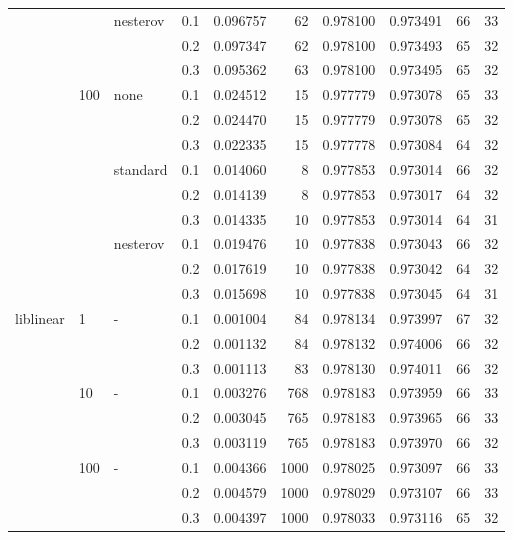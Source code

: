 \begin{table}[H]
\begin{tabular}{llllrrrrrr}
          &     & nesterov & 0.1 &  0.096757 &      62 &  0.978100 &  0.973491 &          66 &        33 \\
          &     &   & 0.2 &  0.097347 &      62 &  0.978100 &  0.973493 &          65 &        32 \\
          &     &   & 0.3 &  0.095362 &      63 &  0.978100 &  0.973495 &          65 &        32 \\
          & 100 & none & 0.1 &  0.024512 &      15 &  0.977779 &  0.973078 &          65 &        33 \\
          &     &   & 0.2 &  0.024470 &      15 &  0.977779 &  0.973078 &          65 &        32 \\
          &     &   & 0.3 &  0.022335 &      15 &  0.977778 &  0.973084 &          64 &        32 \\
          &     & standard & 0.1 &  0.014060 &       8 &  0.977853 &  0.973014 &          66 &        32 \\
          &     &   & 0.2 &  0.014139 &       8 &  0.977853 &  0.973017 &          64 &        32 \\
          &     &   & 0.3 &  0.014335 &      10 &  0.977853 &  0.973014 &          64 &        31 \\
          &     & nesterov & 0.1 &  0.019476 &      10 &  0.977838 &  0.973043 &          66 &        32 \\
          &     &   & 0.2 &  0.017619 &      10 &  0.977838 &  0.973042 &          64 &        32 \\
          &     &   & 0.3 &  0.015698 &      10 &  0.977838 &  0.973045 &          64 &        31 \\
liblinear & 1   & - & 0.1 &  0.001004 &      84 &  0.978134 &  0.973997 &          67 &        32 \\
          &     &   & 0.2 &  0.001132 &      84 &  0.978132 &  0.974006 &          66 &        32 \\
          &     &   & 0.3 &  0.001113 &      83 &  0.978130 &  0.974011 &          66 &        32 \\
          & 10  & - & 0.1 &  0.003276 &     768 &  0.978183 &  0.973959 &          66 &        33 \\
          &     &   & 0.2 &  0.003045 &     765 &  0.978183 &  0.973965 &          66 &        33 \\
          &     &   & 0.3 &  0.003119 &     765 &  0.978183 &  0.973970 &          66 &        32 \\
          & 100 & - & 0.1 &  0.004366 &    1000 &  0.978025 &  0.973097 &          66 &        33 \\
          &     &   & 0.2 &  0.004579 &    1000 &  0.978029 &  0.973107 &          66 &        33 \\
          &     &   & 0.3 &  0.004397 &    1000 &  0.978033 &  0.973116 &          65 &        32 \\
\bottomrule
\end{tabular}
\end{table}
